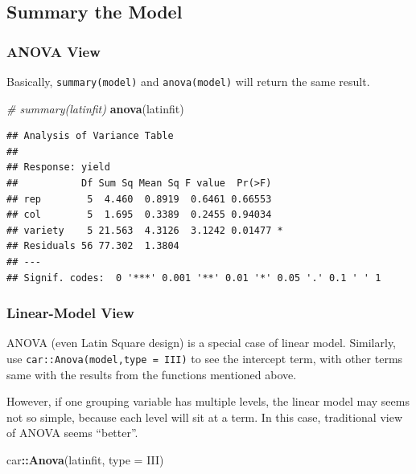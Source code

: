 \documentclass[
]{ctexart}
\newenvironment{Shaded}{\begin{snugshade}}{\end{snugshade}}
\newcommand{\AttributeTok}[1]{\textcolor[rgb]{0.13,0.29,0.53}{#1}}
\newcommand{\CommentTok}[1]{\textcolor[rgb]{0.56,0.35,0.01}{\textit{#1}}}
\newcommand{\FunctionTok}[1]{\textcolor[rgb]{0.13,0.29,0.53}{\textbf{#1}}}
\newcommand{\NormalTok}[1]{#1}
\newcommand{\SpecialCharTok}[1]{\textcolor[rgb]{0.81,0.36,0.00}{\textbf{#1}}}
\newcommand{\StringTok}[1]{\textcolor[rgb]{0.31,0.60,0.02}{#1}}
\begin{document}
\hypertarget{summary-the-model-1}{%
\subsection{Summary the Model}\label{summary-the-model-1}}

\hypertarget{anova-view}{%
\subsubsection{ANOVA View}\label{anova-view}}

Basically, \texttt{summary(model)} and \texttt{anova(model)} will return
the same result.

\begin{Shaded}
\begin{Highlighting}[]
\CommentTok{\# summary(latinfit)}
\FunctionTok{anova}\NormalTok{(latinfit)}
\end{Highlighting}
\end{Shaded}

\begin{verbatim}
## Analysis of Variance Table
## 
## Response: yield
##           Df Sum Sq Mean Sq F value  Pr(>F)  
## rep        5  4.460  0.8919  0.6461 0.66553  
## col        5  1.695  0.3389  0.2455 0.94034  
## variety    5 21.563  4.3126  3.1242 0.01477 *
## Residuals 56 77.302  1.3804                  
## ---
## Signif. codes:  0 '***' 0.001 '**' 0.01 '*' 0.05 '.' 0.1 ' ' 1
\end{verbatim}

\hypertarget{linear-model-view-1}{%
\subsubsection{Linear-Model View}\label{linear-model-view-1}}

ANOVA (even Latin Square design) is a special case of linear model.
Similarly, use
\texttt{car::Anova(model,type\ =\ \textquotesingle{}III\textquotesingle{})}
to see the intercept term, with other terms same with the results from
the functions mentioned above.

However, if one grouping variable has multiple levels, the linear model
may seems not so simple, because each level will sit at a term. In this
case, traditional view of ANOVA seems ``better''.

\begin{Shaded}
\begin{Highlighting}[]
\NormalTok{car}\SpecialCharTok{::}\FunctionTok{Anova}\NormalTok{(latinfit, }\AttributeTok{type =} \StringTok{\textquotesingle{}III\textquotesingle{}}\NormalTok{)}
\end{Highlighting}
\end{Shaded}
\end{document}
